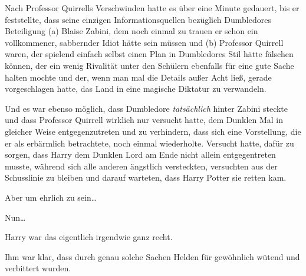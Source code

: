 Nach Professor Quirrells Verschwinden hatte es über eine Minute gedauert, bis er feststellte, dass seine einzigen Informationsquellen bezüglich Dumbledores Beteiligung (a) Blaise Zabini, dem noch einmal zu trauen er schon ein vollkommener, sabbernder Idiot hätte sein müssen und (b) Professor Quirrell waren, der spielend einfach selbst einen Plan in Dumbledores Stil hätte fälschen können, der ein wenig Rivalität unter den Schülern ebenfalls für eine gute Sache halten mochte und der, wenn man mal die Details außer Acht ließ, gerade vorgeschlagen hatte, das Land in eine magische Diktatur zu verwandeln.

Und es war ebenso möglich, dass Dumbledore \emph{tatsächlich} hinter Zabini steckte und dass Professor Quirrell wirklich nur versucht hatte, dem Dunklen Mal in gleicher Weise entgegenzutreten und zu verhindern, dass sich eine Vorstellung, die er als erbärmlich betrachtete, noch einmal wiederholte. Versucht hatte, dafür zu sorgen, dass Harry dem Dunklen Lord am Ende nicht allein entgegentreten musste, während sich alle anderen ängstlich versteckten, versuchten aus der Schusslinie zu bleiben und darauf warteten, dass Harry Potter sie retten kam.

Aber um ehrlich zu sein…

Nun…

Harry war das eigentlich irgendwie ganz recht.

Ihm war klar, dass durch genau solche Sachen Helden für gewöhnlich wütend und verbittert wurden.

